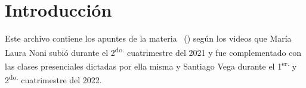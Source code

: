 \chapter{Introducción}

Este archivo contiene los apuntes de la materia \materia \, (\codigomateria)
según los videos que María Laura Noni subió durante el 2\textsuperscript{do.}
cuatrimestre del 2021 y fue complementado con las clases presenciales 
dictadas por ella misma y Santiago Vega durante el 1\textsuperscript{er.}
y 2\textsuperscript{do.} cuatrimestre del 2022.
